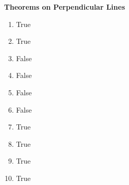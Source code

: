 \begin{center}
\textbf{Theorems on Perpendicular Lines}\\
\end{center}

\vspace*{1ex}

{\begin{enumerate}[label = \arabic*. ]
\item True \redcheck 
\item True \redcheck 
\item False \redcheck 
\item False \redcheck 
\item False \redcheck 
\item False \redcheck 
\item True \redcheck 
\item True \redcheck 
\item True \redcheck 
\item True \redcheck 
\end{enumerate}}





     